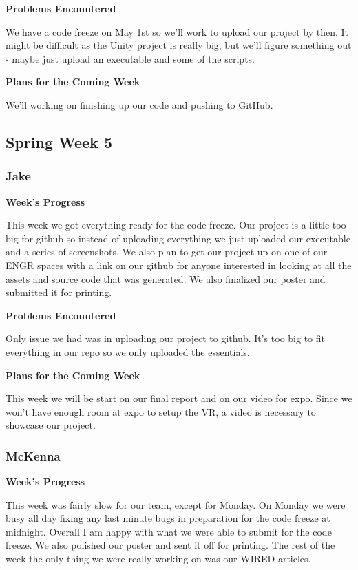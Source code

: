 \documentclass[10pt,journal,compsoc,onecolumn, draftclsnofoot]{IEEEtran}
\begin{document}
\noindent \textbf{Problems Encountered}

We have a code freeze on May 1st so we'll work to upload our project by then. It might be difficult as the Unity project is really big, but we'll figure something out - maybe just upload an executable and some of the scripts.

\noindent \textbf{Plans for the Coming Week}

We'll working on finishing up our code and pushing to GitHub.

\subsection{Spring Week 5}
\subsubsection{Jake}
\noindent \textbf{Week's Progress}

This week we got everything ready for the code freeze. Our project is a little too big for github so instead of uploading everything we just uploaded our executable and a series of screenshots. We also plan to get our project up on one of our ENGR spaces with a link on our github for anyone interested in looking at all the assets and source code that was generated. We also finalized our poster and submitted it for printing.

\noindent \textbf{Problems Encountered}

Only issue we had was in uploading our project to github. It's too big to fit everything in our repo so we only uploaded the essentials.

\noindent \textbf{Plans for the Coming Week}

This week we will be start on our final report and on our video for expo. Since we won't have enough room at expo to setup the VR, a video is necessary to showcase our project.

\subsubsection{McKenna}
\noindent \textbf{Week's Progress}

This week was fairly slow for our team, except for Monday. On Monday we were busy all day fixing any last minute bugs in preparation for the code freeze at midnight. Overall I am happy with what we were able to submit for the code freeze. We also polished our poster and sent it off for printing. The rest of the week the only thing we were really working on was our WIRED articles.
\end{document}
